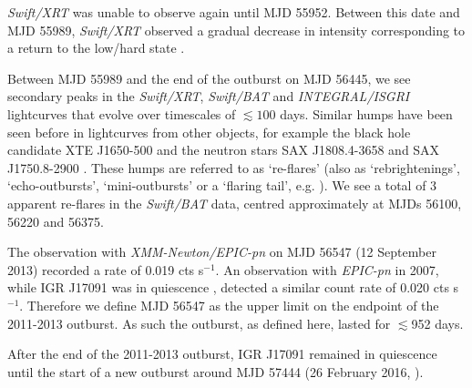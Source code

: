 \par \textit{Swift/XRT} was unable to observe again until MJD 55952.  Between this date and MJD 55989, \textit{Swift/XRT} observed a gradual decrease in intensity corresponding to a return to the low/hard state \citep{Drave_Return}.
\par Between MJD 55989 and the end of the outburst on MJD 56445, we see secondary peaks in the \textit{Swift/XRT}, \textit{Swift/BAT} and \textit{INTEGRAL/ISGRI} lightcurves that evolve over timescales of $\lesssim100$ days.  Similar humps have been seen before in lightcurves from other objects, for example the black hole candidate XTE J1650-500 \citep{Tomsick_MiniOutbursts} and the neutron stars SAX J1808.4-3658 \citep{Wijnands_1808} and SAX J1750.8-2900 \citep{Allen_1750}.  These humps are referred to as `re-flares' (also as `rebrightenings',  `echo-outbursts', `mini-outbursts' or a `flaring tail', e.g. \citealp{Patruno_Reflares2}).  We see a total of 3 apparent re-flares in the \textit{Swift/BAT} data, centred approximately at MJDs 56100, 56220 and 56375.
\par The observation with \textit{XMM-Newton/EPIC-pn} on MJD 56547 (12 September 2013) recorded a rate of 0.019 cts s$^{-1}$.  An observation with \textit{EPIC-pn} in 2007, while IGR J17091 was in quiescence \citep{Wijnands_Quiescence}, detected a similar count rate of 0.020 cts s$^{-1}$.  Therefore we define MJD 56547 as the upper limit on the endpoint of the 2011-2013 outburst.  As such the outburst, as defined here, lasted for $\lesssim$952 days.
\par After the end of the 2011-2013 outburst, IGR J17091 remained in quiescence until the start of a new outburst around MJD 57444 (26 February 2016, \citealp{Miller_2016Outburst}).

\subsection{\rxte}

